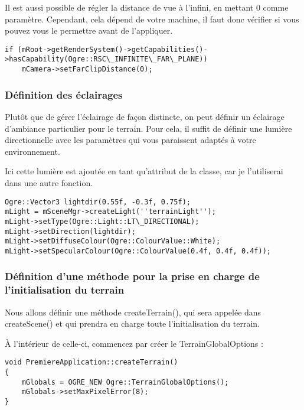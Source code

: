 Il est aussi possible de r\'egler la distance de vue \`a l'infini, en mettant 0 comme param\`etre. Cependant, cela d\'epend de votre machine, il faut donc v\'erifier si vous pouvez vous le permettre avant de l'appliquer.

\begin{lstlisting}[caption={V\'erification et r\'eglages de vue \`a l'infini}]
if (mRoot->getRenderSystem()->getCapabilities()->hasCapability(Ogre::RSC\_INFINITE\_FAR\_PLANE))
    mCamera->setFarClipDistance(0);
\end{lstlisting}




\subsubsection{D\'efinition des \'eclairages}
Plut\^ot que de g\'erer l'\'eclairage de fa\c{c}on distincte, on peut d\'efinir un \'eclairage d'ambiance particulier pour le terrain. Pour cela, il suffit de d\'efinir une lumi\`ere directionnelle avec les param\`etres qui vous paraissent adapt\'es \`a votre environnement. 

Ici cette lumi\`ere est ajout\'ee en tant qu'attribut de la classe, car je l'utiliserai dans une autre fonction.

\begin{lstlisting}[caption={D\'efinition de l'\'eclairage pour le terrain}]
Ogre::Vector3 lightdir(0.55f, -0.3f, 0.75f);
mLight = mSceneMgr->createLight(''terrainLight'');
mLight->setType(Ogre::Light::LT\_DIRECTIONAL);
mLight->setDirection(lightdir);
mLight->setDiffuseColour(Ogre::ColourValue::White);
mLight->setSpecularColour(Ogre::ColourValue(0.4f, 0.4f, 0.4f));
\end{lstlisting}




\subsubsection{D\'efinition d'une m\'ethode pour la prise en charge de l'initialisation du terrain}

Nous allons d\'efinir une m\'ethode createTerrain(), qui sera appel\'ee dans createScene() et qui prendra en charge toute l'initialisation du terrain.

\`A l'int\'erieur de celle-ci, commencez par cr\'eer le TerrainGlobalOptions :

\begin{lstlisting}[caption={M\'ethode pour la prise en charge de l'initialisation du terrain}]
void PremiereApplication::createTerrain()
{
    mGlobals = OGRE_NEW Ogre::TerrainGlobalOptions();
    mGlobals->setMaxPixelError(8);
}
\end{lstlisting}

